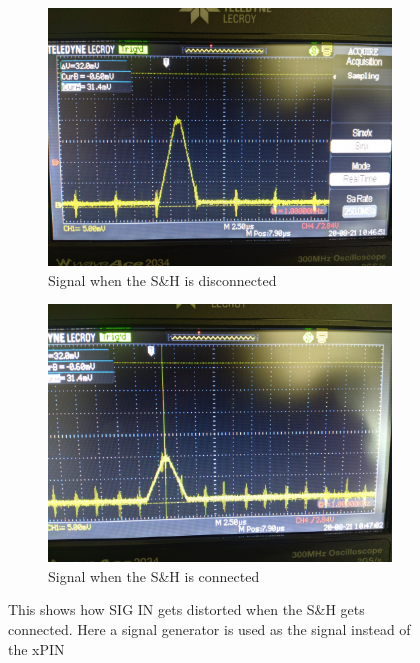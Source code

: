 \documentclass[a4paper, 10pt]{article}
\begin{document}
\begin{figure}[H]
    \centering
    \begin{subfigure}{0.45\textwidth}
        \includegraphics[width=\textwidth]{./images/sample-hold-sg-clean.jpg}
        \caption{Signal when the S\&H is disconnected}
        \label{fig:sample-hold-pin-clean}
    \end{subfigure}
    \begin{subfigure}{0.45\textwidth}
        \includegraphics[width=\textwidth]{./images/sample-hold-sg-dist.jpg}
        \caption{Signal when the S\&H is connected}
    \end{subfigure}
    \caption{This shows how SIG IN gets distorted when the S\&H gets connected. Here a signal generator is used as the signal instead of the xPIN}
    \label{fig:sample-hold-dist-sg}
\end{figure}
\end{document}
